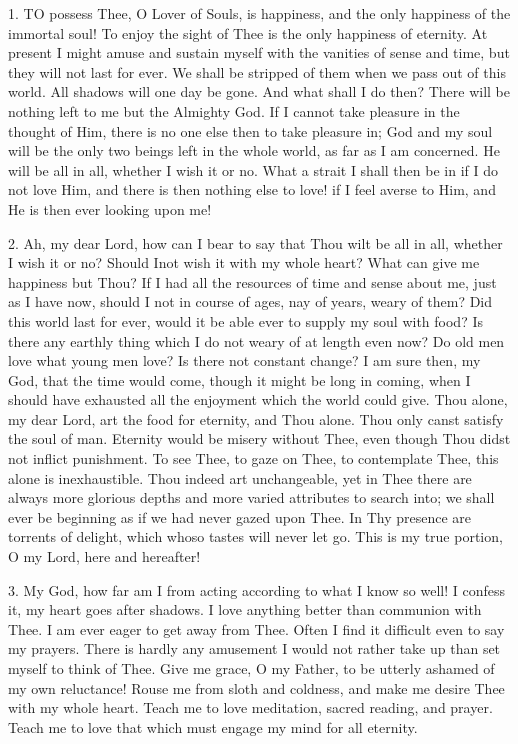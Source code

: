 
1. TO
possess Thee, O Lover of Souls, is happiness, and the only happiness of
the immortal soul! To enjoy the sight of Thee is the only happiness of
eternity. At present I might amuse and sustain myself with the vanities
of sense and time, but they will not last for ever. We shall be stripped
of them when we pass out of this world. All shadows will one day be
gone. And what shall I do then? There will be nothing left to me but the
Almighty God. If I cannot take pleasure in the thought of Him, there is
no one else then to take pleasure in; God and my soul will be the only
two beings left in the whole world, as far as I am concerned. He will be
all in all, whether I wish it or no. What a strait I shall then be in if
I do not love Him, and there is then nothing else to love! if I feel
averse to Him, and He is then ever looking upon me!

2. Ah, my dear Lord, how can I
bear to say that Thou wilt be all in all, whether I wish it or no? Should I\emph{}not wish it with my whole heart? What can give me
happiness but Thou? If I had all the resources of time and sense about
me, just as I have now, should I not in course of ages, nay of years,
weary of them? Did this world last for ever, would it be able ever to
supply my soul with food? Is there any earthly thing which I do not
weary of at length even now? Do old men love what young men love? Is
there not constant change? I am sure then, my God, that the time would
come, though it might be long in coming, when I should have exhausted
all the enjoyment which the world could give. Thou alone, my dear Lord,
art the food for eternity, and Thou alone. Thou only canst satisfy the
soul of man. Eternity would be misery without Thee, even though Thou
didst not inflict punishment. To see Thee, to gaze on Thee, to
contemplate Thee, this alone is inexhaustible. Thou indeed art
unchangeable, yet in Thee there are always more glorious depths and more
varied attributes to search into; we shall ever be beginning as if we
had never gazed upon Thee. In Thy presence are torrents of delight,
which whoso tastes will never let go. This is my true portion, O my
Lord, here and hereafter!

3. My God, how far am I from
acting according to what I know so well! I confess it, my heart goes
after shadows. I love anything better than communion with Thee. I am
ever eager to get away from Thee. Often I find it difficult even to say
my prayers. There is hardly any amusement I would not rather take up
than set myself to think of Thee. Give me grace, O my Father, to be
utterly ashamed of my own reluctance! Rouse me from sloth and
coldness, and make me desire Thee with my whole heart. Teach me to love
meditation, sacred reading, and prayer. Teach me to love that which must
engage my mind for all eternity.

